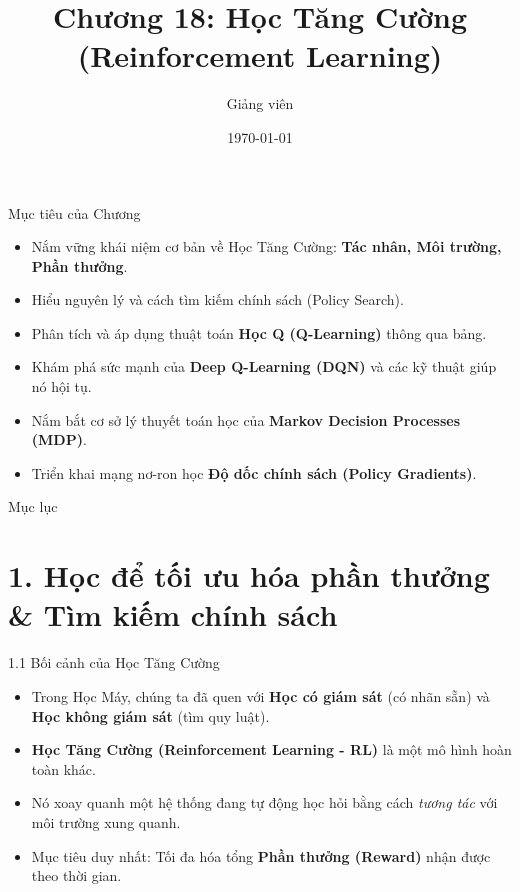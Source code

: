 \documentclass[aspectratio=169, 12pt]{beamer}
\title[ML - Chap 18]{Chương 18: Học Tăng Cường (Reinforcement Learning)}
\author[Giảng viên]{Giảng viên}
\institute[Đại học Đông Á]{Đại học Đông Á}
\date{\today}
\begin{document}
\begin{frame}
    \titlepage
\end{frame}

\begin{frame}{Mục tiêu của Chương}
    \begin{itemize}
        \item Nắm vững khái niệm cơ bản về Học Tăng Cường: \textbf{Tác nhân, Môi trường, Phần thưởng}.
        \item Hiểu nguyên lý và cách tìm kiếm chính sách (Policy Search).
        \item Phân tích và áp dụng thuật toán \textbf{Học Q (Q-Learning)} thông qua bảng.
        \item Khám phá sức mạnh của \textbf{Deep Q-Learning (DQN)} và các kỹ thuật giúp nó hội tụ.
        \item Nắm bắt cơ sở lý thuyết toán học của \textbf{Markov Decision Processes (MDP)}.
        \item Triển khai mạng nơ-ron học \textbf{Độ dốc chính sách (Policy Gradients)}.
    \end{itemize}
\end{frame}

\begin{frame}{Mục lục}
    \tableofcontents
\end{frame}

\section{1. Học để tối ưu hóa phần thưởng \& Tìm kiếm chính sách}

\begin{frame}{1.1 Bối cảnh của Học Tăng Cường}
    \begin{itemize}
        \item Trong Học Máy, chúng ta đã quen với \textbf{Học có giám sát} (có nhãn sẵn) và \textbf{Học không giám sát} (tìm quy luật).
        \item \textbf{Học Tăng Cường (Reinforcement Learning - RL)} là một mô hình hoàn toàn khác.
        \item Nó xoay quanh một hệ thống đang tự động học hỏi bằng cách \textit{tương tác} với môi trường xung quanh.
        \item Mục tiêu duy nhất: Tối đa hóa tổng \textbf{Phần thưởng (Reward)} nhận được theo thời gian.
    \end{itemize}
\end{frame}
\end{document}
